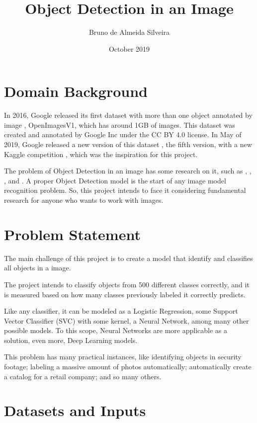 \documentclass[11pt]{article}
\title{\textbf{Object Detection in an Image}}
\author{Bruno de Almeida Silveira}
\date{October 2019}
\begin{document}
\maketitle

\section{Domain Background}

In 2016, Google released its first dataset with more than one object annotated by image \cite{google:1}, OpenImagesV1, which has around 1GB of images. This dataset was created and annotated by Google Inc under the CC BY 4.0 license.  In May of 2019, Google released a new version of this dataset \cite{google:2}, the fifth version, with a new Kaggle competition \cite{kaggle}, which was the inspiration for this project.

The problem of Object Detection in an image has some research on it, such as \cite{intro:1}, \cite{intro:2}, \cite{intro:3}, and \cite{intro:4}. A proper Object Detection model is the start of any image model recognition problem. So, this project intends to face it considering fundamental research for anyone who wants to work with images.


\section{Problem Statement}

The main challenge of this project is to create a model that identify and classifies all objects in a image.

The project intends to classify objects from 500 different classes correctly, and it is measured based on how many classes previously labeled it correctly predicts.

Like any classifier, it can be modeled as a Logistic Regression, some Support Vector Classifier (SVC) with some kernel, a Neural Network, among many other possible models. To this scope, Neural Networks are more applicable as a solution, even more, Deep Learning models.

This problem has many practical instances, like identifying objects in security footage; labeling a massive amount of photos automatically; automatically create a catalog for a retail company; and so many others.

\section{Datasets and Inputs}
\end{document}
